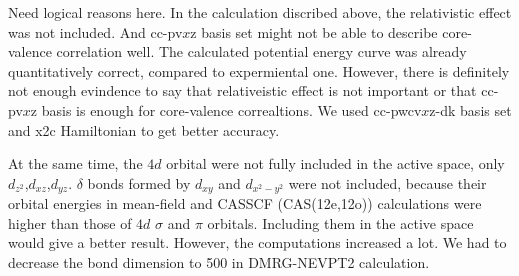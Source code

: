 Need logical reasons here.
In the calculation discribed above, the relativistic effect was not included. And cc-pv$x$z basis set might not be able to describe core-valence correlation well.
The calculated potential energy curve was already quantitatively correct, compared to expermiental one. However, there is definitely not enough evindence to say that relativeistic effect is not important or that cc-pv$x$z basis is enough for core-valence correaltions.
We used cc-pwcv$x$z-dk basis set and x2c Hamiltonian to get better accuracy.

At the same time, the $4d$ orbital were not fully included in the active space, only $d_{z^2}$,$d_{xz}$,$d_{yz}$. $\delta$ bonds formed by $d_{xy}$ and $d_{x^2-y^2}$ were not included, because their orbital energies in mean-field and CASSCF (CAS(12e,12o)) calculations were higher than those of $4d$ $\sigma$ and $\pi$ orbitals. Including them in the active space would give a better result. However, the computations increased a lot. We had to decrease the bond dimension to 500 in DMRG-NEVPT2 calculation.

